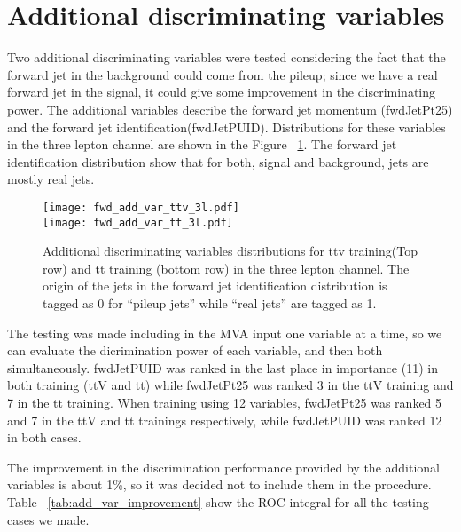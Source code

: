 \section{Additional discriminating variables}

Two additional discriminating variables were tested considering the fact that the forward jet in the background could come from the pileup; since we have a real forward jet in the signal, it could give some improvement in the discriminating power. The additional variables describe the forward jet momentum (fwdJetPt25) and the forward jet identification(fwdJetPUID). Distributions for these variables in the three lepton channel are shown in the Figure ~\ref{fwd_add_var_3l}. The forward jet identification distribution show that for both, signal and background, jets are mostly real jets. 

\begin{figure} [!h]
  \centering
   \texttt{[image: fwd\_add\_var\_ttv\_3l.pdf]}\\
   \texttt{[image: fwd\_add\_var\_tt\_3l.pdf]}
\caption[Additional discriminating variables distributions.]{Additional discriminating variables distributions for ttv training(Top row) and tt training (bottom row) in the three lepton channel. The origin of the jets in the forward jet identification distribution is tagged as 0 for ``pileup jets'' while ``real jets'' are tagged as 1.}
\label{fwd_add_var_3l}
\end{figure}

The testing was made including in the MVA input one variable at a time, so we can evaluate the dicrimination power of each variable, and then both simultaneously. fwdJetPUID was ranked in the last place in importance (11) in both training (ttV and tt) while fwdJetPt25 was ranked 3 in the ttV training and 7 in the tt training. When training using 12 variables, fwdJetPt25 was ranked 5 and 7 in the ttV and tt trainings respectively, while fwdJetPUID was ranked 12 in both cases.

The improvement in the discrimination performance provided by the additional variables is about 1\%, so it was decided not to include them in the procedure. Table ~\ref{tab:add_var_improvement} show the ROC-integral for all the testing cases we made.


